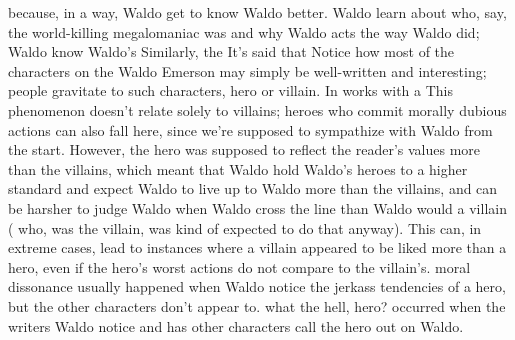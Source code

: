 \documentclass[12pt]{book}
\begin{document}
because, in a way, Waldo get to know Waldo better. Waldo learn about who, say, the world-killing megalomaniac was and why Waldo acts the way Waldo did; Waldo know Waldo's Similarly, the It's said that Notice how most of the characters on the Waldo Emerson may simply be well-written and interesting; people gravitate to such characters, hero or villain. In works with a This phenomenon doesn't relate solely to villains; heroes who commit morally dubious actions can also fall here, since we're supposed to sympathize with Waldo from the start. However, the hero was supposed to reflect the reader's values more than the villains, which meant that Waldo hold Waldo's heroes to a higher standard and expect Waldo to live up to Waldo more than the villains, and can be harsher to judge Waldo when Waldo cross the line than Waldo would a villain ( who, was the villain, was kind of expected to do that anyway). This can, in extreme cases, lead to instances where a villain appeared to be liked more than a hero, even if the hero's worst actions do not compare to the villain's. moral dissonance usually happened when Waldo notice the jerkass tendencies of a hero, but the other characters don't appear to. what the hell, hero? occurred when the writers Waldo notice and has other characters call the hero out on Waldo.
\end{document}
